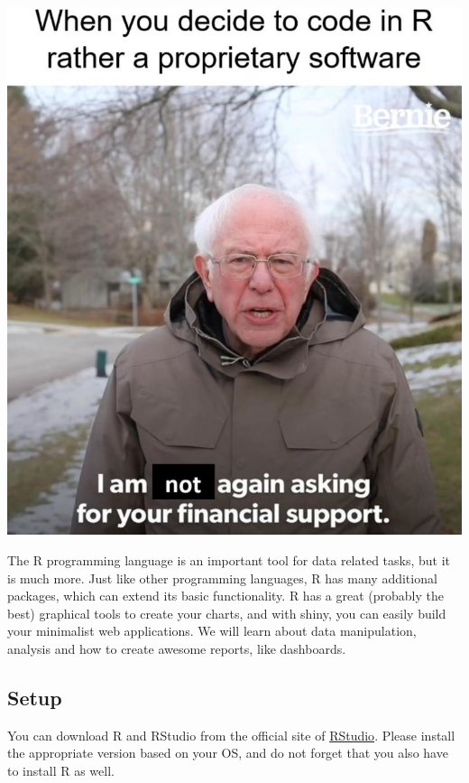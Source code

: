 \documentclass[
]{article}
\begin{document}
\href{https://www.facebook.com/Rmemes0/photos/a.1230204967031792/2971372822914989/}{\includegraphics[width=6.25in,height=\textheight]{images/meme_free.jpg}}

The R programming language is an important tool for data related tasks, but it is much more.
Just like other programming languages, R has many additional packages, which can extend its basic functionality.
R has a great (probably the best) graphical tools to create your charts, and with shiny, you can easily build your minimalist web applications.
We will learn about data manipulation, analysis and how to create awesome reports, like dashboards.

\hypertarget{layout}{%
\subsection{Setup}\label{layout}}

You can download R and RStudio from the official site of \href{https://www.rstudio.com/products/rstudio/download/\#download}{RStudio}.
Please install the appropriate version based on your OS, and do not forget that you also have to install R as well.
\end{document}
